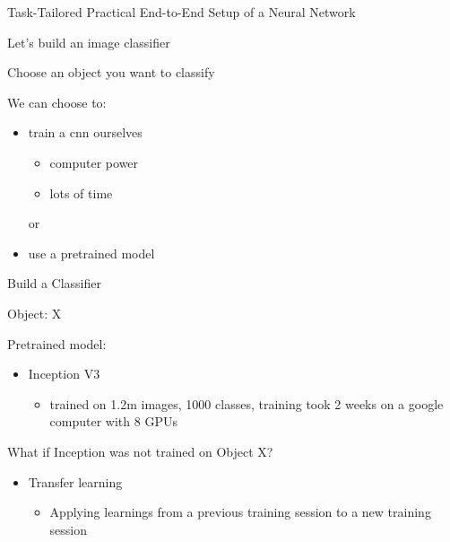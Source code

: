 \documentclass[12pt,t]{beamer}
\begin{document}
\begin{frame}[c]{Task-Tailored Practical End-to-End Setup of a Neural Network}

\pause

Let's build an image classifier %
\pause

Choose an object you want to classify
\pause

We can choose to:
\pause

\begin{itemize}
\item train a cnn ourselves
\pause

\begin{itemize}
\item computer power
\pause

\item lots of time
\pause
 
\end{itemize}
\pause

or 
\pause

\item use a pretrained model

\end{itemize}

\end{frame}

\begin{frame}[c]{Build a Classifier}

\pause

Object: X
\pause

Pretrained model: \pause
\begin{itemize}
\item  Inception V3 \pause
	\begin{itemize}
		\item trained on 1.2m images, 1000 classes, training took 2 weeks on a google computer with 8 GPUs
	\end{itemize}
\end{itemize}
\pause

What if Inception was not trained on Object X?
\pause

\begin{itemize}

\item Transfer learning
\pause

	\begin{itemize}

	\item Applying learnings from a previous training session to a new training session
	\end{itemize}

\end{itemize}

\end{frame}
\end{document}
